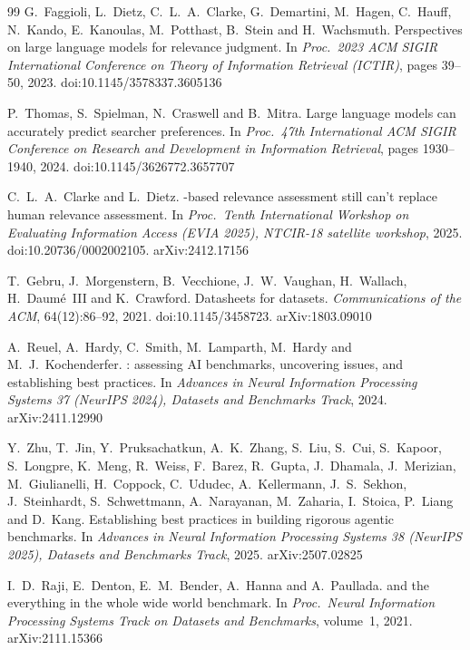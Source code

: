 \documentclass[11pt,a4paper]{article}
\begin{document}
\begin{thebibliography}{99}
G.~Faggioli, L.~Dietz, C.~L.~A.~Clarke, G.~Demartini, M.~Hagen, C.~Hauff,
N.~Kando, E.~Kanoulas, M.~Potthast, B.~Stein and H.~Wachsmuth.
\newblock Perspectives on large language models for relevance judgment.
\newblock In \emph{Proc.\ 2023 ACM SIGIR International Conference on Theory
of Information Retrieval (ICTIR)}, pages 39--50, 2023.
\newblock doi:10.1145/3578337.3605136

P.~Thomas, S.~Spielman, N.~Craswell and B.~Mitra.
\newblock Large language models can accurately predict searcher preferences.
\newblock In \emph{Proc.\ 47th International ACM SIGIR Conference on Research
and Development in Information Retrieval}, pages 1930--1940, 2024.
\newblock doi:10.1145/3626772.3657707

C.~L.~A.~Clarke and L.~Dietz.
-based relevance assessment still can't replace human
relevance assessment.
\newblock In \emph{Proc.\ Tenth International Workshop on Evaluating
Information Access (EVIA 2025), NTCIR-18 satellite workshop}, 2025.
\newblock doi:10.20736/0002002105. arXiv:2412.17156

T.~Gebru, J.~Morgenstern, B.~Vecchione, J.~W.~Vaughan, H.~Wallach,
H.~Daum\'e~III and K.~Crawford.
\newblock Datasheets for datasets.
\newblock \emph{Communications of the ACM}, 64(12):86--92, 2021.
\newblock doi:10.1145/3458723. arXiv:1803.09010

A.~Reuel, A.~Hardy, C.~Smith, M.~Lamparth, M.~Hardy and M.~J.~Kochenderfer.
: assessing {AI} benchmarks, uncovering issues, and
establishing best practices.
\newblock In \emph{Advances in Neural Information Processing Systems 37
(NeurIPS 2024), Datasets and Benchmarks Track}, 2024.
\newblock arXiv:2411.12990

Y.~Zhu, T.~Jin, Y.~Pruksachatkun, A.~K.~Zhang, S.~Liu, S.~Cui, S.~Kapoor,
S.~Longpre, K.~Meng, R.~Weiss, F.~Barez, R.~Gupta, J.~Dhamala, J.~Merizian,
M.~Giulianelli, H.~Coppock, C.~Ududec, A.~Kellermann, J.~S.~Sekhon,
J.~Steinhardt, S.~Schwettmann, A.~Narayanan, M.~Zaharia, I.~Stoica,
P.~Liang and D.~Kang.
\newblock Establishing best practices in building rigorous agentic
benchmarks.
\newblock In \emph{Advances in Neural Information Processing Systems 38
(NeurIPS 2025), Datasets and Benchmarks Track}, 2025.
\newblock arXiv:2507.02825

I.~D.~Raji, E.~Denton, E.~M.~Bender, A.~Hanna and A.~Paullada.
 and the everything in the whole wide world benchmark.
\newblock In \emph{Proc.\ Neural Information Processing Systems Track on
Datasets and Benchmarks}, volume~1, 2021.
\newblock arXiv:2111.15366


\end{thebibliography}
\end{document}
